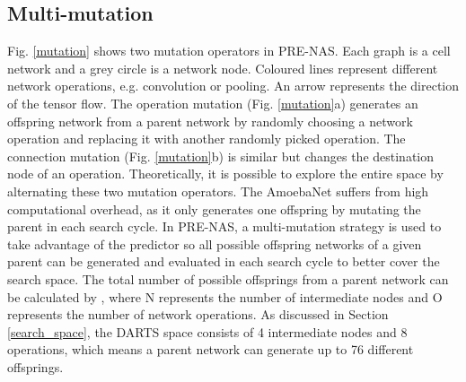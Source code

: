\documentclass[sigconf]{acmart}
\begin{document}
\subsection{Multi-mutation}
\label{sec-mulmutation}
Fig. \ref{mutation} shows two mutation operators in PRE-NAS. Each graph is a cell network and a grey circle is a network node.  Coloured lines represent different network operations, e.g. convolution or pooling.  An arrow represents the direction of the tensor flow. The operation mutation (Fig. \ref{mutation}a) generates an offspring network from a parent network by randomly choosing a network operation and replacing it with another randomly picked operation.  The connection mutation (Fig. \ref{mutation}b) is similar but changes the destination node of an operation.  Theoretically, it is possible to explore the entire space by alternating these two mutation operators. 
The AmoebaNet \cite{Ref:08} suffers from high computational overhead, as it only generates one offspring by mutating the parent in each search cycle. In PRE-NAS, a multi-mutation strategy is used to take advantage of the predictor so all possible offspring networks of a given parent can be generated and evaluated in each search cycle to better cover the search space. The total number of possible offsprings from a parent network can be calculated by , where N represents the number of intermediate nodes and O represents the number of network operations. As discussed in Section \ref{search_space}, the DARTS space consists of 4 intermediate nodes and 8 operations, which means a parent network can generate up to 76 different offsprings.
\end{document}
